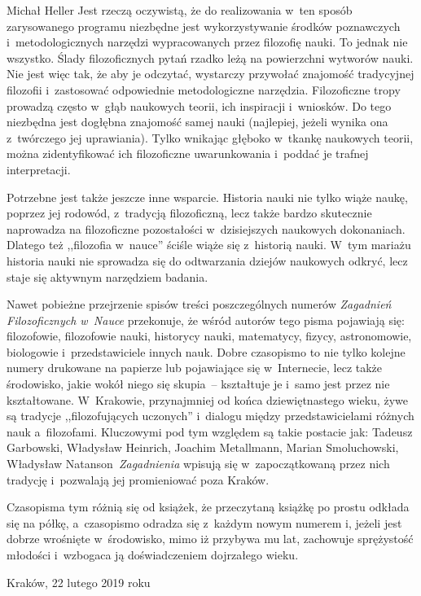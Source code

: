 \begin{editorial}{Michał Heller}
Jest rzeczą oczywistą, że do realizowania w~ten sposób zarysowanego programu niezbędne jest wykorzystywanie środków
poznawczych i~metodologicznych narzędzi wypracowanych przez filozofię nauki. To jednak nie wszystko. Ślady
filozoficznych pytań rzadko leżą na powierzchni wytworów nauki. Nie jest więc tak, że aby je odczytać, wystarczy
przywołać znajomość tradycyjnej filozofii i~zastosować odpowiednie metodologiczne narzędzia. Filozoficzne tropy
prowadzą często w~głąb naukowych teorii, ich inspiracji i~wniosków. Do tego niezbędna jest dogłębna znajomość samej
nauki (najlepiej, jeżeli wynika ona z~twórczego jej uprawiania). Tylko wnikając głęboko w~tkankę naukowych teorii,
można zidentyfikować ich filozoficzne uwarunkowania i~poddać je trafnej interpretacji.

Potrzebne jest także jeszcze inne wsparcie. Historia nauki nie tylko wiąże naukę, poprzez jej rodowód, z~tradycją
filozoficzną, lecz także bardzo skutecznie naprowadza na filozoficzne pozostałości w~dzisiejszych naukowych
dokonaniach. Dlatego też ,,filozofia w~nauce'' ściśle wiąże się z~historią nauki. W~tym mariażu historia nauki nie
sprowadza się do odtwarzania dziejów naukowych odkryć, lecz staje się aktywnym narzędziem badania.

Nawet pobieżne przejrzenie spisów treści poszczególnych numerów \textit{Zagadnień Filozoficznych w~Nauce}
przekonuje, że wśród autorów tego pisma pojawiają się: filozofowie, filozofowie nauki, historycy nauki, matematycy,
fizycy, astronomowie, biologowie i~przedstawiciele innych nauk. Dobre czasopismo to nie tylko kolejne numery drukowane
na papierze lub pojawiające się w~Internecie, lecz także środowisko, jakie wokół niego się skupia~-- kształtuje je i~samo
jest przez nie kształtowane. W~Krakowie, przynajmniej od końca dziewiętnastego wieku, żywe są tradycje
,,filozofujących uczonych'' i~dialogu między przedstawicielami różnych nauk a~filozofami. Kluczowymi pod tym względem są
takie postacie jak: Tadeusz Garbowski, Władysław Heinrich, Joachim Metallmann, Marian Smoluchowski, Władysław
Natanson\mydots\ \textit{Zagadnienia} wpisują się w~zapoczątkowaną przez nich tradycję i~pozwalają jej promieniować poza
Kraków.

Czasopisma tym różnią się od książek, że przeczytaną książkę po prostu odkłada się na półkę, a~czasopismo odradza
się z~każdym nowym numerem i, jeżeli jest dobrze wrośnięte w~środowisko, mimo iż przybywa mu lat, zachowuje sprężystość
młodości i~wzbogaca ją doświadczeniem dojrzałego wieku.

{\raggedleft Kraków, 22 lutego 2019 roku\par}%




\end{editorial}